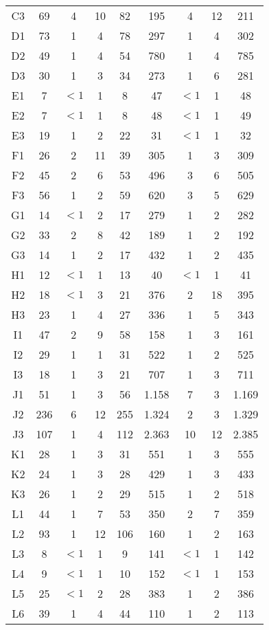 \begin{center}
\begin{longtable}{ccccc|cccc}
C3&69&4&10&82&195&4&12&211\\
D1&73&1&4&78&297&1&4&302\\
D2&49&1&4&54&780&1&4&785\\
D3&30&1&3&34&273&1&6&281\\
E1&7&$<1$&1&8&47&$<1$&1&48\\
E2&7&$<1$&1&8&48&$<1$&1&49\\
E3&19&1&2&22&31&$<1$&1&32\\
F1&26&2&11&39&305&1&3&309\\
F2&45&2&6&53&496&3&6&505\\
F3&56&1&2&59&620&3&5&629\\
G1&14&$<1$&2&17&279&1&2&282\\
G2&33&2&8&42&189&1&2&192\\
G3&14&1&2&17&432&1&2&435\\
H1&12&$<1$&1&13&40&$<1$&1&41\\
H2&18&$<1$&3&21&376&2&18&395\\
H3&23&1&4&27&336&1&5&343\\
I1&47&2&9&58&158&1&3&161\\
I2&29&1&1&31&522&1&2&525\\
I3&18&1&3&21&707&1&3&711\\
J1&51&1&3&56&1.158&7&3&1.169\\
J2&236&6&12&255&1.324&2&3&1.329\\
J3&107&1&4&112&2.363&10&12&2.385\\
K1&28&1&3&31&551&1&3&555\\
K2&24&1&3&28&429&1&3&433\\
K3&26&1&2&29&515&1&2&518\\
L1&44&1&7&53&350&2&7&359\\
L2&93&1&12&106&160&1&2&163\\
L3&8&$<1$&1&9&141&$<1$&1&142\\
L4&9&$<1$&1&10&152&$<1$&1&153\\
L5&25&$<1$&2&28&383&1&2&386\\
L6&39&1&4&44&110&1&2&113\\
\end{longtable}
\end{center}

